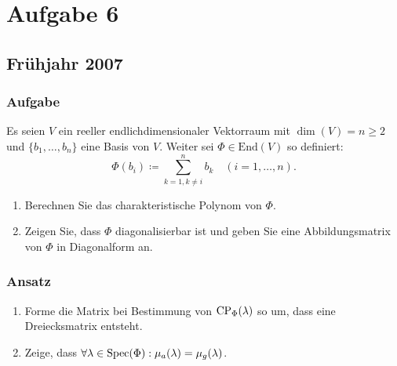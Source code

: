\chapter{Aufgabe 6}

\section{Frühjahr 2007}

\subsection{Aufgabe}
Es seien \( V \) ein reeller endlichdimensionaler Vektorraum mit \( \dim(V) = n \geq 2 \) und \( \{ b_1, \dots, b_n \} \) eine Basis von \( V \). Weiter sei \( \Phi \in \text{End}(V) \) so definiert:
\begin{equation*}
	\Phi(b_i) \coloneqq \sum_{k = 1, k \neq i}^n b_k \quad (i = 1, \dots, n)\text{.}
\end{equation*}
\begin{enumerate}
	\item Berechnen Sie das charakteristische Polynom von \( \Phi \).
	\item Zeigen Sie, dass \( \Phi \) diagonalisierbar ist und geben Sie eine Abbildungsmatrix von \( \Phi \) in Diagonalform an. 
\end{enumerate}

\subsection{Ansatz}
\begin{enumerate}
	\item Forme die Matrix bei Bestimmung von \( \text{CP}_\Phi(\lambda) \) so um, dass eine Dreiecksmatrix entsteht.
	\item Zeige, dass \( \forall \lambda \in \text{Spec}(\Phi): \mu_a(\lambda) = \mu_g(\lambda) \).
\end{enumerate}


